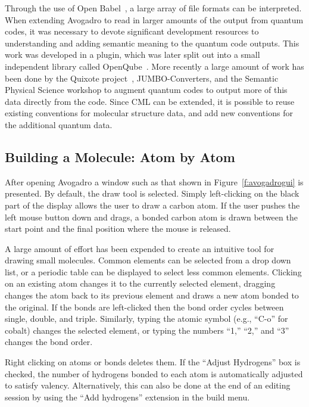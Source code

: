 \documentclass[10pt]{bmc_article}
\newenvironment{bmcformat}{\begin{raggedright}
\baselineskip20pt\sloppy\setboolean{publ}{false}}{\end{raggedright}
\baselineskip20pt\sloppy}
\begin{document}
\begin{bmcformat}
Through the use of Open Babel~\cite{OpenBabel}, a large array of file
formats can be interpreted. When extending Avogadro to read in larger
amounts of the output from quantum codes, it was necessary to devote
significant development resources to understanding and adding semantic
meaning to the quantum code outputs. This work was developed in a plugin, which was later split out into a small independent
library called OpenQube~\cite{OpenQube}\cite{OpenQubeSource}. More recently a large amount of work has been done
by the Quixote project~\cite{Quixote}, JUMBO-Converters, and the Semantic
Physical Science workshop to augment quantum codes to output more of this data
directly from the code. Since CML can be extended, it is possible to reuse
existing conventions for molecular structure data, and add new
conventions for the additional quantum data.

\subsection{Building a Molecule: Atom by Atom}

After opening Avogadro a window such as that shown in Figure~\ref{f:avogadrogui}
is presented. By default, the draw tool is selected. Simply left-clicking on the
black part of the display
allows the user to draw a carbon atom. If the user pushes the left
mouse button down and drags, a bonded carbon atom is drawn
between the start point and the final position where the mouse is released.

A large amount of effort has been expended to create an intuitive tool for
drawing small molecules. Common elements can be selected from a drop down list,
or a periodic table can be displayed to select less common elements. Clicking on
an existing atom changes it to the currently selected element,
dragging changes the atom back to its previous element and draws
a new atom bonded to the original. If the bonds are left-clicked then the bond
order cycles between single, double, and triple. Similarly, typing the
atomic symbol (e.g., ``C-o'' for cobalt) changes the selected element,
or typing the numbers ``1,'' ``2,'' and ``3'' changes the bond order.

Right clicking on atoms or bonds deletes them. If the ``Adjust Hydrogens'' box
is checked, the number of hydrogens bonded to each atom is automatically
adjusted to satisfy valency. Alternatively, this can also be done at the end of
an editing session by using the ``Add hydrogens'' extension in the build menu.


\end{bmcformat}
\end{document}
